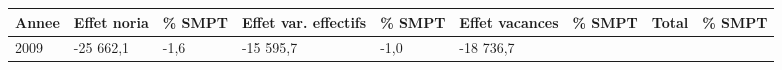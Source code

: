 \begin{longtable}[]{@{}lllllllll@{}}
\toprule
\begin{minipage}[b]{0.05\columnwidth}\raggedright
Annee\strut
\end{minipage} & \begin{minipage}[b]{0.10\columnwidth}\raggedright
Effet noria\strut
\end{minipage} & \begin{minipage}[b]{0.06\columnwidth}\raggedright
\% SMPT\strut
\end{minipage} & \begin{minipage}[b]{0.16\columnwidth}\raggedright
Effet var. effectifs\strut
\end{minipage} & \begin{minipage}[b]{0.06\columnwidth}\raggedright
\% SMPT\strut
\end{minipage} & \begin{minipage}[b]{0.12\columnwidth}\raggedright
Effet vacances\strut
\end{minipage} & \begin{minipage}[b]{0.06\columnwidth}\raggedright
\% SMPT\strut
\end{minipage} & \begin{minipage}[b]{0.09\columnwidth}\raggedright
Total\strut
\end{minipage} & \begin{minipage}[b]{0.06\columnwidth}\raggedright
\% SMPT\strut
\end{minipage}\tabularnewline
\midrule
\endhead
\begin{minipage}[t]{0.05\columnwidth}\raggedright
2009\strut
\end{minipage} & \begin{minipage}[t]{0.10\columnwidth}\raggedright
-25 662,1\strut
\end{minipage} & \begin{minipage}[t]{0.06\columnwidth}\raggedright
-1,6\strut
\end{minipage} & \begin{minipage}[t]{0.16\columnwidth}\raggedright
-15 595,7\strut
\end{minipage} & \begin{minipage}[t]{0.06\columnwidth}\raggedright
-1,0\strut
\end{minipage} & \begin{minipage}[t]{0.12\columnwidth}\raggedright
-18 736,7\strut
\end{minipage} & \begin{minipage}[t]{0.06\columnwidth}\raggedright

\end{minipage}
\end{longtable}
